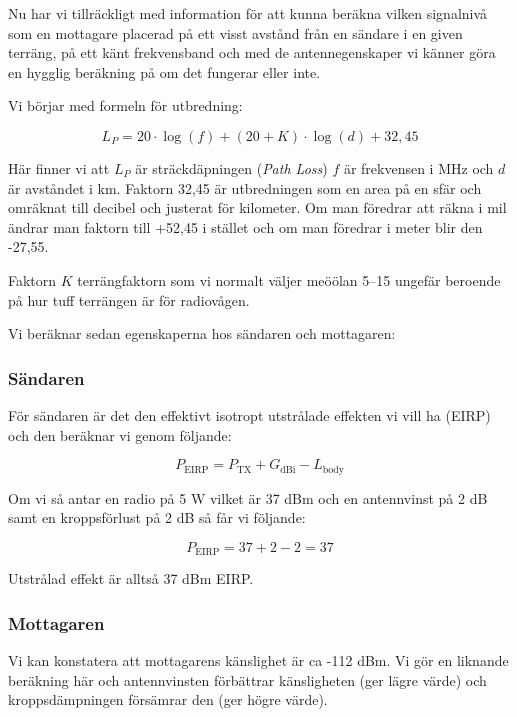 Nu har vi tillräckligt med information för att kunna beräkna vilken signalnivå som en mottagare placerad på ett visst avstånd från en sändare i en given terräng, på ett känt frekvensband och med de antennegenskaper vi känner göra en hygglig beräkning på om det fungerar eller inte.

Vi börjar med formeln för utbredning:

\begin{equation}
L_P = 20\cdot\log(f)+(20+K)\cdot\log(d)+32,45
\end{equation}

Här finner vi att $L_P$ är sträckdäpningen (\textit{Path Loss}) $f$ är frekvensen i MHz och $d$ är avståndet i km. Faktorn 32,45 är utbredningen som en area på en sfär och omräknat till decibel och justerat för kilometer. Om man föredrar att räkna i mil ändrar man faktorn till +52,45 i stället och om man föredrar i meter blir den -27,55.

Faktorn $K$ terrängfaktorn som vi normalt väljer meöölan 5--15 ungefär beroende på hur tuff terrängen är för radiovågen.

Vi beräknar sedan egenskaperna hos sändaren och mottagaren:

\subsubsection{Sändaren}

För sändaren är det den effektivt isotropt utstrålade effekten vi vill ha (EIRP) och den beräknar vi genom följande:

\begin{equation}
P_{\mathrm{EIRP}}=P_{\mathrm{TX}} + G_{\mathrm{dBi}} - L_{\mathrm{body}}
\end{equation}

Om vi så antar en radio på 5 W vilket är 37 dBm och en antennvinst på 2 dB samt en kroppsförlust på 2 dB så får vi följande:

\begin{equation}
P_{\mathrm{EIRP}}=37 + 2 - 2 = 37
\end{equation}

Utstrålad effekt är alltså 37 dBm EIRP.

\subsubsection{Mottagaren}

Vi kan konstatera att mottagarens känslighet är ca -112 dBm. Vi gör en liknande beräkning här och antennvinsten förbättrar känsligheten (ger lägre värde) och kroppsdämpningen försämrar den (ger högre värde). 


